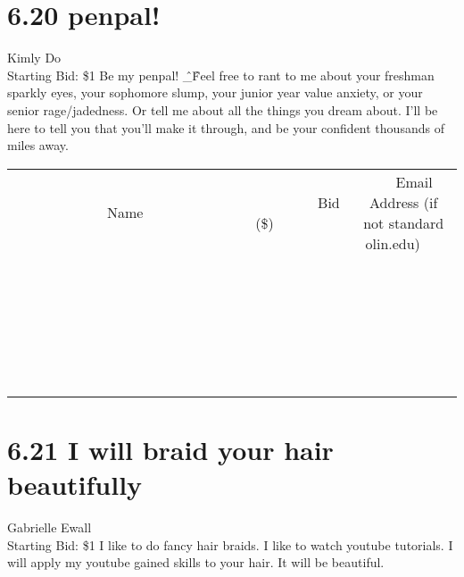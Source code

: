 \documentclass[11pt]{article}
\begin{document}
\section*{6.20 penpal!}
Kimly Do
\\
Starting Bid: \$1
\newline
Be my penpal! \^\_\^ Feel free to rant to me about your freshman sparkly eyes, your sophomore slump, your junior year value anxiety, or your senior rage/jadedness. Or tell me about all the things you dream about. I'll be here to tell you that you'll make it through, and be your confident thousands of miles away.
\\[6ex]
\begin{tabular}{c c c}
~~~~~~~~~~~~~Name~~~~~~~~~~~~~ & ~~~~~~~~~Bid (\$)~~~~~~~~~  & ~~~Email Address (if not standard olin.edu)~~~\\
 & & \\
\hline
 & & \\
\hline
 & & \\
\hline
 & & \\
\hline
 & & \\
\hline
 & & \\
\hline
 & & \\
\hline
 & & \\
\hline
 & & \\
\hline
 & & \\
\hline
 & & \\
\hline
 & & \\
\hline
 & & \\
\hline
 & & \\
\hline
 & & \\
\hline
 & & \\
\hline
 & & \\
\hline
 & & \\
\hline
 & & \\
\hline
 & & \\
\hline
 & & \\
\hline
 & & \\
\hline
 & & \\
\hline
 & & \\
\hline
 & & \\
\hline
 & & \\
\hline
\end{tabular}
\newpage
\section*{6.21 I will braid your hair beautifully}
Gabrielle Ewall
\\
Starting Bid: \$1
\newline
I like to do fancy hair braids.  I like to watch youtube tutorials.  I will apply my youtube gained skills to your hair.  It will be beautiful.
\end{document}
